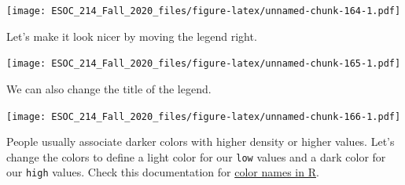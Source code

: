 \documentclass[
]{book}
\newenvironment{Shaded}{\begin{snugshade}}{\end{snugshade}}
\newcommand{\DataTypeTok}[1]{\textcolor[rgb]{0.13,0.29,0.53}{#1}}
\newcommand{\KeywordTok}[1]{\textcolor[rgb]{0.13,0.29,0.53}{\textbf{#1}}}
\newcommand{\NormalTok}[1]{#1}
\newcommand{\OperatorTok}[1]{\textcolor[rgb]{0.81,0.36,0.00}{\textbf{#1}}}
\newcommand{\StringTok}[1]{\textcolor[rgb]{0.31,0.60,0.02}{#1}}
\begin{document}
\texttt{[image: ESOC\_214\_Fall\_2020\_files/figure-latex/unnamed-chunk-164-1.pdf]}

Let's make it look nicer by moving the legend right.

\begin{Shaded}
\end{Shaded}

\texttt{[image: ESOC\_214\_Fall\_2020\_files/figure-latex/unnamed-chunk-165-1.pdf]}

We can also change the title of the legend.

\begin{Shaded}
\end{Shaded}

\texttt{[image: ESOC\_214\_Fall\_2020\_files/figure-latex/unnamed-chunk-166-1.pdf]}

People usually associate darker colors with higher density or higher values. Let's change the colors to define a light color for our \texttt{low} values and a dark color for our \texttt{high} values. Check this documentation for \href{http://www.stat.columbia.edu/~tzheng/files/Rcolor.pdf}{color names in R}.

\begin{Shaded}
\end{Shaded}
\end{document}
